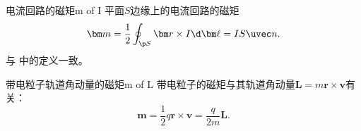 \begin{example}
    {电流回路的磁矩}{m of I}
    平面$S$边缘上的电流回路的磁矩
    \begin{align*}
        \bm m=\frac12\oint_{\p S}\bm r\times I\d\bm\ell=IS\uvec n.
    \end{align*}
    与 中的定义一致。
\end{example}

\begin{example}
    {带电粒子轨道角动量的磁矩}{m of L}
    带电粒子的磁矩与其轨道角动量$\bm L=m\bm r\times\bm v$有关：
    \[
        \bm m=\frac12q\bm r\times\bm v=\frac q{2m}\bm L.
    \]
\end{example}

